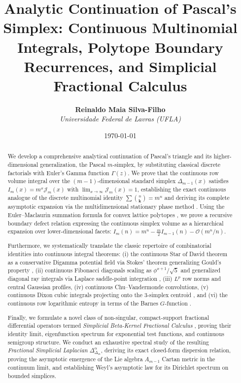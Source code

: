 \documentclass[11pt,a4paper]{article}
\title{\textbf{Analytic Continuation of Pascal's Simplex: Continuous Multinomial Integrals, Polytope Boundary Recurrences, and Simplicial Fractional Calculus}}
\author{\textbf{Reinaldo Maia Silva-Filho} \\ \textit{Universidade Federal de Lavras (UFLA)}}
\date{\today}
\theoremstyle{plain}
\theoremstyle{definition}
\theoremstyle{remark}
\numberwithin{equation}{section}
\begin{document}
\maketitle

\begin{abstract}
We develop a comprehensive analytical continuation of Pascal's triangle and its higher-dimensional generalization, the Pascal $m$-simplex, by substituting classical discrete factorials with Euler's Gamma function $\Gamma(z)$. We prove that the continuous row volume integral over the $(m-1)$-dimensional standard simplex $\Delta_{m-1}(x)$ satisfies $I_m(x) = m^x \mathcal{J}_m(x)$ with $\lim_{x\to\infty}\mathcal{J}_m(x)=1$, establishing the exact continuous analogue of the discrete multinomial identity $\sum \binom{n}{\mathbf{k}} = m^n$ and deriving its complete asymptotic expansion via the multidimensional stationary phase method \cite{wong2001}. Using the Euler--Maclaurin summation formula for convex lattice polytopes \cite{berline2007}, we prove a recursive boundary defect relation expressing the continuous simplex volume as a hierarchical expansion over lower-dimensional facets: $I_m(n) = m^n - \frac{m}{2}I_{m-1}(n) - \mathcal{O}(m^n/n)$.

Furthermore, we systematically translate the classic repertoire of combinatorial identities into continuous integral theorems: (i) the continuous Star of David theorem as a conservative Digamma potential field via Stokes' theorem generalizing Gould's property \cite{gould1972}, (ii) continuous Fibonacci diagonals scaling as $\phi^{x+1}/\sqrt{5}$ and generalized diagonal ray integrals via Laplace saddle-point integration \cite{olver1997}, (iii) $L^p$ row norms and central Gaussian profiles, (iv) continuous Chu--Vandermonde convolutions, (v) continuous Dixon cubic integrals projecting onto the 3-simplex centroid \cite{dixon1891}, and (vi) the continuous row logarithmic entropy in terms of the Barnes $G$-function \cite{barnes1900}.

Finally, we formulate a novel class of non-singular, compact-support fractional differential operators termed \emph{Simplicial Beta-Kernel Fractional Calculus} \cite{samko1993, podlubny1998}, proving their identity limit, eigenfunction spectrum for exponential test functions, and continuous semigroup structure. We conduct an exhaustive spectral study of the resulting \emph{Fractional Simplicial Laplacian} $\Delta_{\Delta_m}^\alpha$, deriving its exact closed-form dispersion relation, proving the asymptotic emergence of the Lie algebra $A_{m-1}$ Cartan metric in the continuum limit, and establishing Weyl's asymptotic law for its Dirichlet spectrum on bounded simplices.
\end{abstract}
\end{document}
